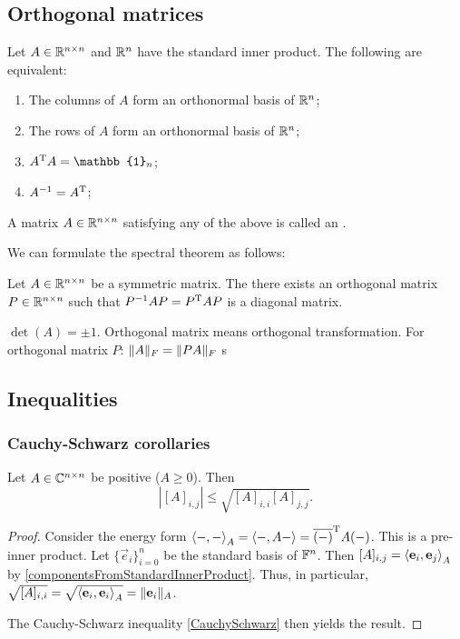\subsection{Orthogonal matrices}
\begin{proposition}
Let $A\in\mathbb{R}^{n\times n}$ and $\mathbb{R}^n$ have the standard inner product. The following are equivalent:
\begin{enumerate}
\item The columns of $A$ form an orthonormal basis of $\mathbb{R}^n$;
\item The rows of $A$ form an orthonormal basis of $\mathbb{R}^n$;
\item $A^\transp A = \mathbb{1}_n$;
\item $A^{-1} = A^{\mathrm{T}}$;
\end{enumerate}
\end{proposition}
\begin{definition}
A matrix $A\in\mathbb{R}^{n\times n}$ satisfying any of the above is called an .
\end{definition}
We can formulate the spectral theorem as follows:
\begin{proposition}
Let $A\in\mathbb{R}^{n\times n}$ be a symmetric matrix. The there exists an orthogonal matrix $P\in \mathbb{R}^{n\times n}$ such that $P^{-1}AP = P^{\mathrm{T}} A P$ is a diagonal matrix.
\end{proposition}

$\det(A) = \pm 1$. Orthogonal matrix means orthogonal transformation.
For orthogonal matrix $P$: $\lVert A\rVert_F = \lVert PA\rVert_F$
s

\subsection{Inequalities}
\subsubsection{Cauchy-Schwarz corollaries}
\begin{lemma}
Let $A\in \mathbb{C}^{n\times n}$ be positive ($A\geq 0$). Then
\[ |[A]_{i,j}| \leq \sqrt{[A]_{i,i}[A]_{j,j}}. \]
\end{lemma}
\begin{proof}
Consider the energy form $\left\langle -, - \right\rangle_A = \left\langle -, A- \right\rangle = \overline{(-)}^{\mathrm{T}} A(-)$. This is a pre-inner product. Let $\{\vec{e}_i\}_{i=0}^n$ be the standard basis of $\mathbb{F}^n$. Then $[A]_{i,j} = \left\langle \boldsymbol{\mathrm{e}}_i, \boldsymbol{\mathrm{e}}_j \right\rangle_A$ by \ref{componentsFromStandardInnerProduct}. Thus, in particular, $\sqrt{[A]_{i,i}} = \sqrt{\left\langle \boldsymbol{\mathrm{e}}_i, \boldsymbol{\mathrm{e}}_i \right\rangle_A} = \lVert\boldsymbol{\mathrm{e}}_i\rVert_A$.

The Cauchy-Schwarz inequality \ref{CauchySchwarz} then yields the result.
\end{proof}

